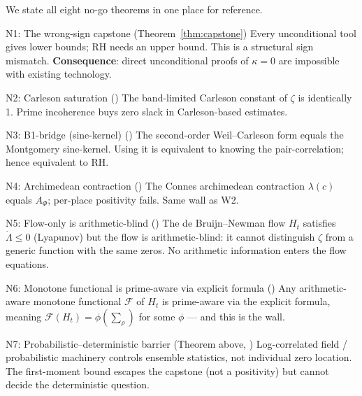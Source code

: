 \documentclass[11pt]{amsart}
\theoremstyle{definition}
\theoremstyle{remark}
\newcommand{\kap}{\kappa}
\newcommand{\Lam}{\Lambda}
\begin{document}
We state all eight no-go theorems in one place for reference.

\begin{nogobox}{N1: The wrong-sign capstone}
(Theorem~\ref{thm:capstone})
Every unconditional tool gives lower bounds; RH needs an upper bound.
This is a structural sign mismatch. \textbf{Consequence}: direct unconditional proofs
of $\kap=0$ are impossible with existing technology.
\end{nogobox}

\begin{nogobox}{N2: Carleson saturation}
(\cite{RP11})
The band-limited Carleson constant of $\zeta$ is identically 1.
Prime incoherence buys zero slack in Carleson-based estimates.
\end{nogobox}

\begin{nogobox}{N3: B1-bridge (sine-kernel)}
(\cite{RP11})
The second-order Weil--Carleson form equals the Montgomery sine-kernel.
Using it is equivalent to knowing the pair-correlation; hence equivalent to RH.
\end{nogobox}

\begin{nogobox}{N4: Archimedean contraction}
(\cite{RP11})
The Connes archimedean contraction $\lambda(c)$ equals $A_\Phi$; per-place positivity
fails.  Same wall as W2.
\end{nogobox}

\begin{nogobox}{N5: Flow-only is arithmetic-blind}
(\cite{RP12})
The de Bruijn--Newman flow $H_t$ satisfies $\dot\Lam\le 0$ (Lyapunov) but the
flow is arithmetic-blind: it cannot distinguish $\zeta$ from a generic function
with the same zeros.  No arithmetic information enters the flow equations.
\end{nogobox}

\begin{nogobox}{N6: Monotone functional is prime-aware via explicit formula}
(\cite{RP14})
Any arithmetic-aware monotone functional $\mathcal{F}$ of $H_t$ is prime-aware
via the explicit formula, meaning $\mathcal{F}(H_t) = \phi(\sum_\rho)$ for some $\phi$
--- and this is the wall.
\end{nogobox}

\begin{nogobox}{N7: Probabilistic--deterministic barrier}
(Theorem above, \cite{RP14})
Log-correlated field / probabilistic machinery controls ensemble statistics, not
individual zero location.  The first-moment bound escapes the capstone (not a
positivity) but cannot decide the deterministic question.
\end{nogobox}
\end{document}
